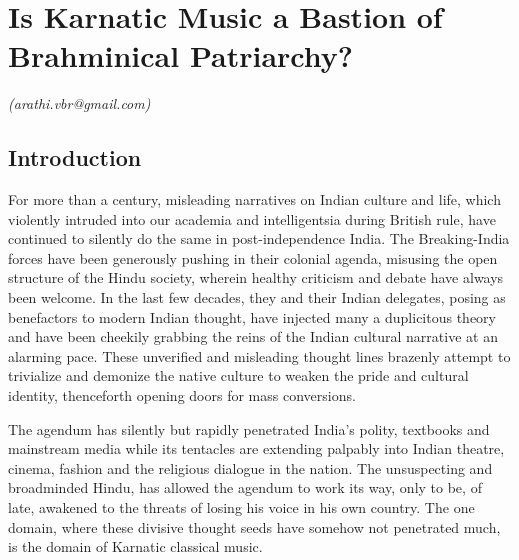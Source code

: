 
\chapter{Is Karnatic Music a Bastion of Brahminical Patriarchy?}\label{chapter7}


\vspace{-.3cm}


\begin{flushright}
\textit{(arathi.vbr@gmail.com)}
\end{flushright}


\section*{Introduction}

For more than a century, misleading narratives on Indian culture and life, which violently intruded into our academia and intelligentsia during British rule, have continued to silently do the same in post-independence India. The Breaking-India forces have been generously pushing in their colonial agenda, misusing the open structure of the Hindu society, wherein healthy criticism and debate have always been welcome. In the last few decades, they and their Indian delegates, posing as benefactors to modern Indian thought, have injected many a duplicitous theory and have been cheekily grabbing the reins of the Indian cultural narrative at an alarming pace. These unverified and misleading thought lines brazenly attempt to trivialize and demonize the native culture to weaken the pride and cultural identity, thenceforth opening doors for mass conversions.

The agendum has silently but rapidly penetrated India’s polity, textbooks and mainstream media while its tentacles are extending palpably into Indian theatre, cinema, fashion and the religious dialogue in the nation. The unsuspecting and broadminded Hindu, has allowed the agendum to work its way, only to be, of late, awakened to the threats of losing his voice in his own country. The one domain, where these divisive thought seeds have somehow not penetrated much, is the domain of Karnatic classical music.

